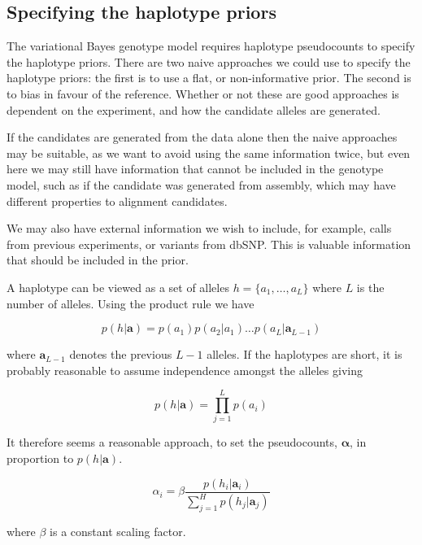 \documentclass{article}
\begin{document}
\subsection{Specifying the haplotype priors}

The variational Bayes genotype model requires haplotype pseudocounts to specify the haplotype priors. There are two naive approaches we could use to specify the haplotype priors: the first is to use a flat, or non-informative prior. The second is to bias in favour of the reference. Whether or not these are good approaches is dependent on the experiment, and how the candidate alleles are generated.

If the candidates are generated from the data alone then the naive approaches may be suitable, as we want to avoid using the same information twice, but even here we may still have information that cannot be included in the genotype model, such as if the candidate was generated from assembly, which may have different properties to alignment candidates.

We may also have external information we wish to include, for example, calls from previous experiments, or variants from dbSNP. This is valuable information that should be included in the prior.

A haplotype can be viewed as a set of alleles $h = \{a_1, \dots, a_L\}$ where $L$ is the number of alleles. Using the product rule we have

\begin{equation}
    p(h | \boldsymbol{a}) = p(a_1)p(a_2 | a_1)\dots p(a_L | \boldsymbol{a}_{L-1})
\end{equation}

where $\boldsymbol{a}_{L-1}$ denotes the previous $L-1$ alleles. If the haplotypes are short, it is probably reasonable to assume independence amongst the alleles giving

\begin{equation}
    p(h | \boldsymbol{a}) = \prod_{j = 1}^L p(a_i)
\end{equation}

It therefore seems a reasonable approach, to set the pseudocounts, $\boldsymbol{\alpha}$, in proportion to $p(h | \boldsymbol{a})$.  

\begin{equation}
    \alpha_i = \beta \frac{p(h_i | \boldsymbol{a}_i)}{\sum_{j = 1}^H p(h_j | \boldsymbol{a}_j)}
\end{equation}

where $\beta$ is a constant scaling factor. 
\end{document}
